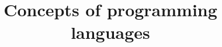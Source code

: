 \documentclass[a4paper]{article}
\title{Concepts of programming languages}
\begin{document}
    \maketitle
    \tableofcontents
    \pagebreak
    
    
\end{document}
